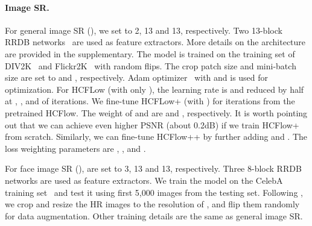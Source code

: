 \documentclass[10pt,twocolumn,letterpaper]{article}
\begin{document}
\vspace{-0.4cm}
\paragraph{Image SR.}
For general image SR (), we set  to 2, 13 and 13, respectively. Two 13-block RRDB networks~\cite{wang2018esrgan} are used as feature extractors. More details on the architecture are provided in the supplementary. The model is trained on the training set of DIV2K~\cite{DIV2K} and Flickr2K~\cite{Flickr2K} with random flips. The crop patch size and mini-batch size are set to  and , respectively. Adam optimizer~\cite{kingma2014adam} with  and  is used for optimization. For HCFLow (with only ), the learning rate is  and reduced by half at , ,  and  of  iterations. We fine-tune HCFLow+ (with ) for  iterations from the pretrained HCFlow. The weight of  and  are  and , respectively. It is worth pointing out that we can achieve even higher PSNR (about 0.2dB) if we train HCFlow+ from scratch. Similarly, we can fine-tune HCFlow++ by further adding  and . The loss weighting parameters are , ,  and .


For face image SR (),  are set to 3, 13 and 13, respectively. Three 8-block RRDB networks are used as feature extractors. We train the model on the CelebA training set~\cite{liu2015celeba} and test it using first 5,000 images from the testing set. Following \cite{kingma2018glow, lugmayr2020srflow}, we crop and resize the HR images to the resolution of , and flip them randomly for data augmentation. Other training details are the same as general image SR.
\end{document}

